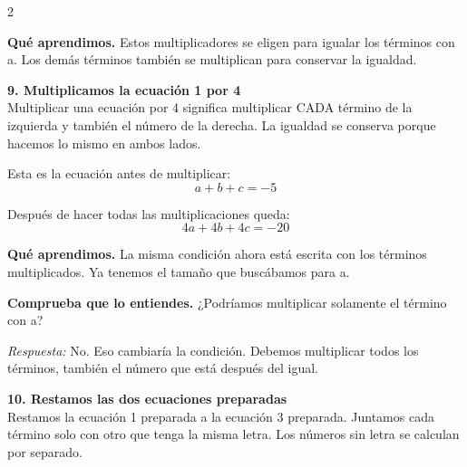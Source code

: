 \documentclass[11pt,a4paper,landscape]{article}
\begin{document}
\begin{multicols*}{2}
\begin{minipage}{\linewidth}
\par\smallskip\textbf{Qué aprendimos.} Estos multiplicadores se eligen para igualar los términos con a. Los demás términos también se multiplican para conservar la igualdad.
\end{minipage}\par\medskip
\noindent\begin{minipage}{\linewidth}\textbf{9. Multiplicamos la ecuación 1 por 4}\\[2pt]Multiplicar una ecuación por 4 significa multiplicar CADA término de la izquierda y también el número de la derecha. La igualdad se conserva porque hacemos lo mismo en ambos lados.
\par\smallskip Esta es la ecuación antes de multiplicar:
\[a + b + c = -5\]
\par{}\par\smallskip
\par\smallskip Después de hacer todas las multiplicaciones queda:
\[4a + 4b + 4c = -20\]
\par\smallskip\textbf{Qué aprendimos.} La misma condición ahora está escrita con los términos multiplicados. Ya tenemos el tamaño que buscábamos para a.
\par\smallskip\textbf{Comprueba que lo entiendes.} ¿Podríamos multiplicar solamente el término con a?\par\textit{Respuesta:} No. Eso cambiaría la condición. Debemos multiplicar todos los términos, también el número que está después del igual.
\end{minipage}\par\medskip
\noindent\begin{minipage}{\linewidth}\textbf{10. Restamos las dos ecuaciones preparadas}\\[2pt]Restamos la ecuación 1 preparada a la ecuación 3 preparada. Juntamos cada término solo con otro que tenga la misma letra. Los números sin letra se calculan por separado.

\end{minipage}
\end{multicols*}
\end{document}
